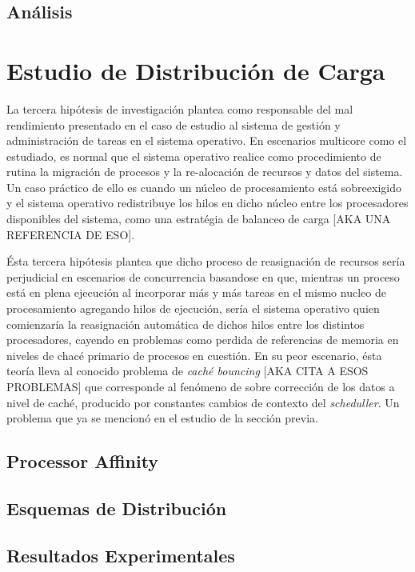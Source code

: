\subsection{Análisis}

\section{Estudio de Distribución de Carga}
La tercera hipótesis de investigación plantea como responsable del mal rendimiento presentado en el caso de estudio al sistema de gestión y administración de tareas en el sistema operativo. En escenarios multicore como el estudiado, es normal que el sistema operativo realice como procedimiento de rutina la migración de procesos y la re-alocación de recursos y datos del sistema. Un caso práctico de ello es cuando un núcleo de procesamiento está sobreexigido y el sistema operativo redistribuye los hilos en dicho núcleo entre los procesadores disponibles del sistema, como una estratégia de balanceo de carga [AKA UNA REFERENCIA DE ESO].

Ésta tercera hipótesis plantea que dicho proceso de reasignación de recursos sería perjudicial en escenarios de concurrencia basandose en que, mientras un proceso está en plena ejecución al incorporar más y más tareas en el mismo nucleo de procesamiento agregando hilos de ejecución, sería el sistema operativo quien comienzaría la reasignación automática de dichos hilos entre los distintos procesadores, cayendo en problemas como perdida de referencias de memoria en niveles de chacé primario de procesos en cuestión. En su peor escenario, ésta teoría lleva al conocido problema de \emph{caché bouncing} [AKA CITA A ESOS PROBLEMAS] que corresponde al fenómeno de sobre corrección de los datos a nivel de caché, producido por constantes cambios de contexto del \emph{scheduller}. Un problema que ya se mencionó en el estudio de la sección previa.

\subsection{Processor Affinity}
\subsection{Esquemas de Distribución}
\subsection{Resultados Experimentales}